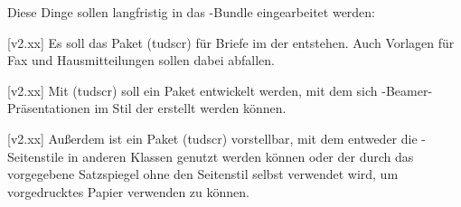 Diese Dinge sollen langfristig in das \TUDScript-Bundle eingearbeitet werden:

[v2.xx]
Es soll das Paket (tudscr) für Briefe im \CD der \TnUD 
entstehen. Auch Vorlagen für Fax und Hausmitteilungen sollen dabei abfallen.

[v2.xx]
Mit (tudscr) soll ein Paket entwickelt werden, mit dem 
sich -Beamer-Präsentationen im Stil der \TnUD erstellt werden 
können.

[v2.xx]
Außerdem ist ein Paket (tudscr) vorstellbar, mit dem 
entweder die -Seitenstile in anderen Klassen genutzt 
werden können oder der durch das \CD vorgegebene Satzspiegel ohne den 
Seitenstil selbst verwendet wird, um vorgedrucktes Papier verwenden zu können.
